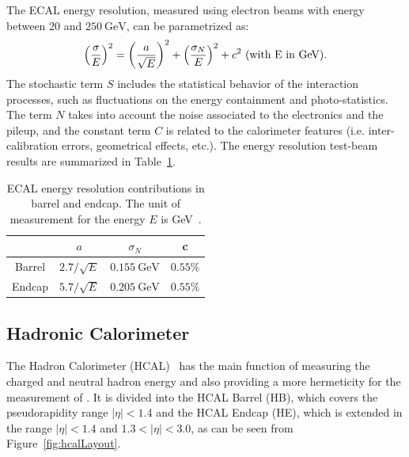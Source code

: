 The ECAL energy resolution, measured using electron beams with energy
between $20$ and $250~\si{\GeV}$, can be parametrized as: 
\begin{equation}
    \left(\frac{\sigma}{E}\right)^2= \left(\frac{a}{\sqrt{E}}\right)^2 + \left(\frac{\sigma_N}{E}\right)^2 + c^2\mbox{      (with E in \si{\GeV}).}
    \label{eq:resolutionECAL}
\end{equation} 
The stochastic term $S$ includes the statistical behavior of the interaction
processes, such as fluctuations on the energy containment and photo-statistics. The term $N$ takes into account
the noise associated to the electronics and the pileup, and the constant term $C$
is related to the calorimeter features (i.e. inter-calibration errors, geometrical effects, etc.). 
The energy resolution test-beam results are summarized in Table~\ref{tab:ecalRes}.

\begin{table}[htp]
\begin{center}
\caption{ECAL energy resolution contributions in barrel and endcap. The unit of measurement for
the energy $E$ is \si{\GeV}~\cite{ecalTDR}.}
\label{tab:ecalRes}
\begin{tabular}{cc|c|c|}\\
\cline{2-4}
                               & \multicolumn{1}{|c|}{$a$}               & $\sigma_N$              & c \\\hline
\multicolumn{1}{|c|}{Barrel}   & $2.7/\sqrt{E}$    & $0.155~\si{\GeV}$       & $0.55\%$\\
\multicolumn{1}{|c|}{Endcap}   & $5.7/\sqrt{E}$    & $0.205~\si{\GeV}$       & $0.55\%$\\
\hline
\end{tabular}
\end{center}
\end{table}


\subsection{Hadronic Calorimeter}
\label{subsec:hcalo}

The Hadron Calorimeter (HCAL)~\cite{hcalTDR} has the main function of measuring the charged and neutral 
hadron energy and also providing a more hermeticity for the measurement of \met.
It is divided into the HCAL Barrel (HB), which covers the pseudorapidity range $|\eta|<1.4$ and the
HCAL Endcap (HE), which is extended in the range $|\eta|<1.4$ and $1.3<|\eta|<3.0$,
as can be seen from Figure~\ref{fig:hcalLayout}.

